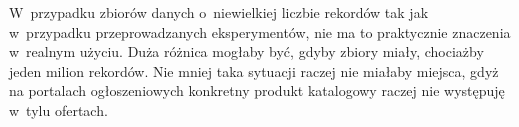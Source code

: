 \documentclass[../Kamil_Kowalewski_Main.tex]{subfiles}
\begin{document}
{{        W~przypadku zbiorów danych o~niewielkiej liczbie rekordów tak jak w~przypadku
        przeprowadzanych eksperymentów, nie ma to praktycznie znaczenia w~realnym
        użyciu. Duża różnica mogłaby być, gdyby zbiory miały, chociażby jeden milion
        rekordów. Nie mniej taka sytuacji raczej nie miałaby miejsca, gdyż na portalach
        ogłoszeniowych konkretny produkt katalogowy raczej nie występuję w~tylu ofertach.
    }

}
\end{document}
